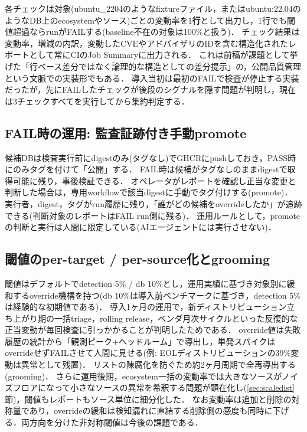 \documentclass{css}
\begin{document}
各チェックは対象(ubuntu\_2204のようなfixtureファイル，またはubuntu:22.04のようなDB上のecosystemやソース)ごとの変動率を1\textbf{行}として出力し，1行でも閾値超過ならrunがFAILする(baseline不在の対象は100\%と扱う)．
チェック結果は変動率，増減の内訳，変動したCVEやアドバイザリのIDを含む構造化されたレポートとして常にCIのJob Summaryに出力される．
これは前稿が課題として挙げた「行ベース差分ではなく論理的な構造としての差分提示」\cite{nakaoka2025}の，公開品質管理という文脈での実装形でもある．
導入当初は最初のFAILで検査が停止する実装だったが，先にFAILしたチェックが後段のシグナルを隠す問題が判明し，現在は3チェックすべてを実行してから集約判定する．

\subsection{FAIL時の運用: 監査証跡付き手動promote}
\label{sec:promote}

候補DBは検査実行前にdigestのみ(タグなし)でGHCRにpushしておき，PASS時にのみタグを付けて「公開」する．
FAIL時は候補がタグなしのままdigestで取得可能に残り，事後検証できる．
オペレータがレポートを確認し正当な変更と判断した場合は，専用workflowで該当digestに手動でタグ付けする(promote)．
実行者，digest，タグがrun履歴に残り，「誰がどの候補をoverrideしたか」が追跡できる(判断対象のレポートはFAIL run側に残る)．
運用ルールとして，promoteの判断と実行は人間に限定している(AIエージェントには実行させない)．

\subsection{閾値のper-target / per-source化とgrooming}
\label{sec:threshold}

閾値はデフォルトでdetection 5\% / db 10\%とし，運用実績に基づき対象別に緩和するoverride機構を持つ(db 10\%は導入前ベンチマークに基づき，detection 5\%は経験的な初期値である)．
導入1ヶ月の運用で，新ディストリビューション立ち上がり期の一括triage，rolling release，ベンダ月次サイクルといった反復的な正当変動が毎回検査に引っかかることが判明したためである．
override値は失敗履歴の統計から「観測ピーク+ヘッドルーム」で導出し，単発スパイクはoverrideせずFAILさせて人間に見せる(例: EOLディストリビューションの39\%変動は異常として残置)．
リストの陳腐化を防ぐため約2ヶ月周期で全再導出する(grooming)．
さらに運用後期，ecosystem一括の変動率では大きなソースがノイズフロアになって小さなソースの異常を希釈する問題が顕在化し(\ref{sec:scaledist}節)，閾値もレポートもソース単位に細分化した．
なお変動率は追加と削除の対称量であり，overrideの緩和は検知漏れに直結する削除側の感度も同時に下げる．両方向を分けた非対称閾値は今後の課題である．
\end{document}

